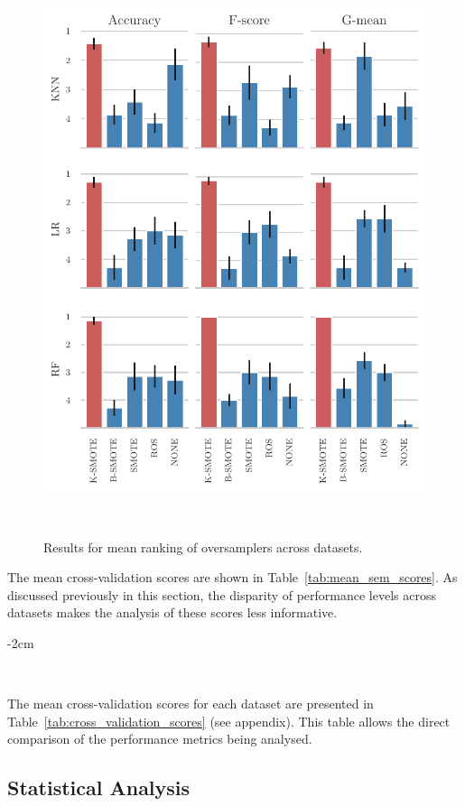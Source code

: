 \begin{figure}
    \centering
	\includegraphics[width=.65\linewidth]{mean_rankings_bar_chart}
	\caption{%
    	Results for mean ranking of oversamplers across datasets.
    }~\label{fig:mean_sem_ranking}
\end{figure}

The mean cross-validation scores are shown in Table~\ref{tab:mean_sem_scores}.
As discussed previously in this section, the disparity of performance levels
across datasets makes the analysis of these scores less informative.

\begin{table}
	\centering
    \addtolength{\leftskip} {-2cm}
    \addtolength{\rightskip}{-2cm}
    \caption{%
    	Mean cross-validation scores of oversamplers.
    }~\label{tab:mean_sem_scores}
\end{table}

The mean cross-validation scores for each dataset are presented in
Table~\ref{tab:cross_validation_scores} (see appendix). This table allows the direct
comparison of the performance metrics being analysed.

\subsection{Statistical Analysis}~\label{sec:statistical_analysis-kmeans}


